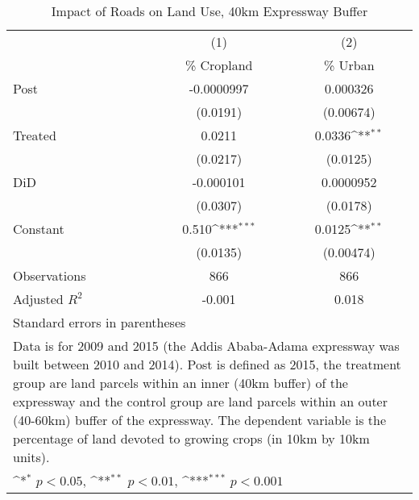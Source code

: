 \begin{table}[htbp]\centering
\def\sym#1{\ifmmode^{#1}\else\(^{#1}\)\fi}
\caption{Impact of Roads on Land Use, 40km Expressway Buffer}
\begin{tabular}{l*{2}{c}}
\hline\hline
                    &\multicolumn{1}{c}{(1)}&\multicolumn{1}{c}{(2)}\\
                    &\multicolumn{1}{c}{\% Cropland}&\multicolumn{1}{c}{\% Urban}\\
\hline
Post                &  -0.0000997         &    0.000326         \\
                    &    (0.0191)         &   (0.00674)         \\
[1em]
Treated             &      0.0211         &      0.0336\sym{**} \\
                    &    (0.0217)         &    (0.0125)         \\
[1em]
DiD                 &   -0.000101         &   0.0000952         \\
                    &    (0.0307)         &    (0.0178)         \\
[1em]
Constant            &       0.510\sym{***}&      0.0125\sym{**} \\
                    &    (0.0135)         &   (0.00474)         \\
\hline
Observations        &         866         &         866         \\
Adjusted \(R^{2}\)  &      -0.001         &       0.018         \\
\hline\hline
\multicolumn{3}{l}{\footnotesize Standard errors in parentheses}\\
\multicolumn{3}{l}{\footnotesize Data is for 2009 and 2015 (the Addis Ababa-Adama expressway was built between 2010 and 2014). Post is defined as 2015, the treatment group are land parcels within an inner (40km buffer) of the expressway and the control group are land parcels within an outer (40-60km) buffer of the expressway. The dependent variable is the percentage of land devoted to growing crops (in 10km by 10km units).}\\
\multicolumn{3}{l}{\footnotesize \sym{*} \(p<0.05\), \sym{**} \(p<0.01\), \sym{***} \(p<0.001\)}\\
\end{tabular}
\end{table}
